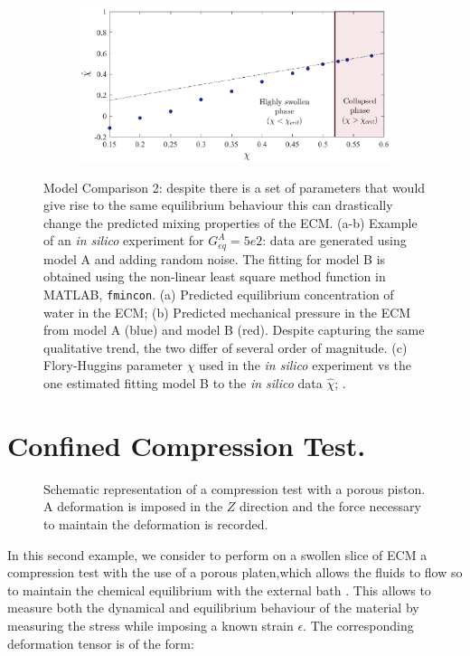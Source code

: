 \documentclass[runningheads]{llncs}
\begin{document}
\begin{figure}
	\centering
	\begin{subfigure}{0.6\textwidth}
		\includegraphics[scale=0.415]{images/chi1}
		\caption{}
	\end{subfigure}
\caption{Model Comparison 2: despite there is a set of parameters that would give rise to the same equilibrium behaviour this can drastically change the predicted mixing properties of the ECM. (a-b) Example of an \textit{in silico} experiment for $G^A_{eq}=5e2$: data are generated using model A and adding random noise. The fitting for model B is obtained using the non-linear least square method function in MATLAB, \texttt{fmincon}. (a) Predicted equilibrium concentration of water in the ECM; (b) Predicted mechanical pressure in the ECM from model A (blue) and model B (red). Despite capturing the same qualitative trend, the two differ of several order of magnitude. (c) Flory-Huggins parameter $\chi$ used in the \textit{in silico} experiment vs the one estimated fitting model B to the \textit{in silico} data $\hat{\chi}$; .}
\end{figure}
\section{Confined Compression Test.}

\begin{figure}[h]
	\centering
	\def\svgwidth{0.89\linewidth}
	
	\vspace{2mm}
	\caption{Schematic representation of a compression test with a porous piston. A deformation is imposed in the $Z$ direction and the force necessary to maintain the deformation is recorded. }
\end{figure}

In this second example, we consider to perform on a swollen slice of ECM a compression test with the use of a porous platen,which allows the fluids to flow so to maintain the chemical equilibrium with the external bath \cite{Netti}. This allows to measure both the dynamical and equilibrium behaviour of the material by measuring the stress while imposing a known strain $\epsilon$. The corresponding deformation tensor is of the form:
\end{document}
